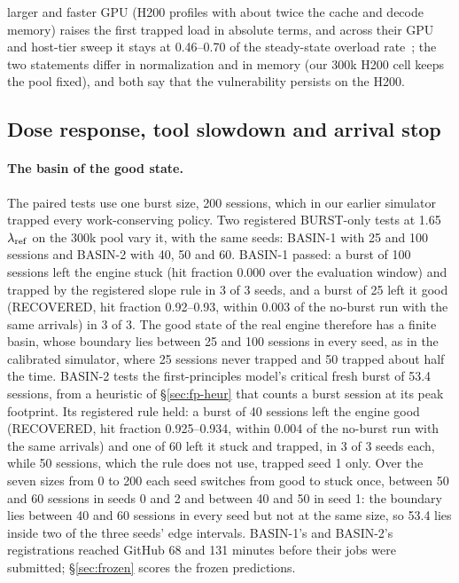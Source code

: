 larger and faster GPU (H200 profiles with about twice the cache and decode memory) raises the first trapped load in absolute terms, and across their GPU and host-tier sweep it stays at 0.46--0.70 of the steady-state overload rate~\citep{lu2026cachetrap}; the two statements differ in normalization and in memory (our 300k H200 cell keeps the pool fixed), and both say that the vulnerability persists on the H200.

\subsection{Dose response, tool slowdown and arrival stop}\label{app:basin}

\paragraph{The basin of the good state.}\label{sec:basin}
The paired tests use one burst size, 200 sessions, which in our earlier simulator trapped every work-conserving policy. Two registered BURST-only tests at 1.65 $\lambda_{\mathrm{ref}}$ on the 300k pool vary it, with the same seeds: BASIN-1 with 25 and 100 sessions and BASIN-2 with 40, 50 and 60. BASIN-1 passed: a burst of 100 sessions left the engine stuck (hit fraction 0.000 over the evaluation window) and trapped by the registered slope rule in 3 of 3 seeds, and a burst of 25 left it good (RECOVERED, hit fraction 0.92--0.93, within 0.003 of the no-burst run with the same arrivals) in 3 of 3. The good state of the real engine therefore has a finite basin, whose boundary lies between 25 and 100 sessions in every seed, as in the calibrated simulator, where 25 sessions never trapped and 50 trapped about half the time. BASIN-2 tests the first-principles model's critical fresh burst of 53.4 sessions, from a heuristic of \S\ref{sec:fp-heur} that counts a burst session at its peak footprint. Its registered rule held: a burst of 40 sessions left the engine good (RECOVERED, hit fraction 0.925--0.934, within 0.004 of the no-burst run with the same arrivals) and one of 60 left it stuck and trapped, in 3 of 3 seeds each, while 50 sessions, which the rule does not use, trapped seed 1 only. Over the seven sizes from 0 to 200 each seed switches from good to stuck once, between 50 and 60 sessions in seeds 0 and 2 and between 40 and 50 in seed 1: the boundary lies between 40 and 60 sessions in every seed but not at the same size, so 53.4 lies inside two of the three seeds' edge intervals. BASIN-1's and BASIN-2's registrations reached GitHub 68 and 131 minutes before their jobs were submitted; \S\ref{sec:frozen} scores the frozen predictions.

